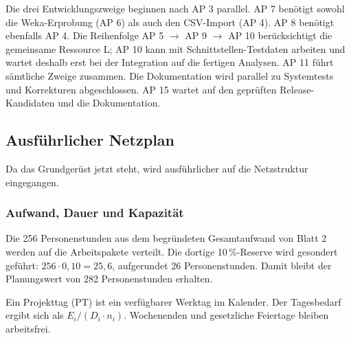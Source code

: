 \documentclass[a4paper,10pt]{article}
\begin{document}
Die drei Entwicklungszweige beginnen nach AP 3 parallel. AP 7 benötigt sowohl die Weka-Erprobung (AP 6) als auch den CSV-Import (AP 4). AP 8 benötigt ebenfalls AP 4. Die Reihenfolge AP 5 $\rightarrow$ AP 9 $\rightarrow$ AP 10 berücksichtigt die gemeinsame Ressource L; AP 10 kann mit Schnittstellen-Testdaten arbeiten und wartet deshalb erst bei der Integration auf die fertigen Analysen. AP 11 führt sämtliche Zweige zusammen. Die Dokumentation wird parallel zu Systemtests und Korrekturen abgeschlossen. AP 15 wartet auf den geprüften Release-Kandidaten und die Dokumentation.

\clearpage
\subsection*{Ausführlicher Netzplan}
Da das Grundgerüst jetzt steht, wird ausführlicher auf die Netzstruktur eingegangen.
\subsubsection*{Aufwand, Dauer und Kapazität}
Die 256 Personenstunden aus dem begründeten Gesamtaufwand von Blatt 2 werden auf die Arbeitspakete verteilt. Die dortige 10\,\%-Reserve wird gesondert geführt: $256\cdot0{,}10=25{,}6$, aufgerundet 26 Personenstunden. Damit bleibt der Planungswert von 282 Personenstunden erhalten.

Ein Projekttag (PT) ist ein verfügbarer Werktag im Kalender. Der Tagesbedarf ergibt sich als $E_i/(D_i\cdot n_i)$. Wochenenden und gesetzliche Feiertage bleiben arbeitsfrei.
\end{document}
